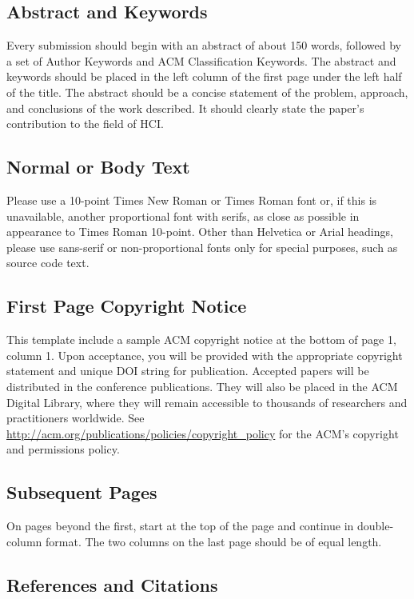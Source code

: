 \documentclass{sigchi}
\begin{document}
\subsection{Abstract and Keywords}

Every submission should begin with an abstract of about 150 words,
followed by a set of Author Keywords and ACM Classification
Keywords. The abstract and keywords should be placed in the left
column of the first page under the left half of the title. The
abstract should be a concise statement of the problem, approach, and
conclusions of the work described. It should clearly state the paper's
contribution to the field of HCI\@.

\subsection{Normal or Body Text}

Please use a 10-point Times New Roman or Times Roman font or, if this
is unavailable, another proportional font with serifs, as close as
possible in appearance to Times Roman 10-point. Other than Helvetica
or Arial headings, please use sans-serif or non-proportional fonts
only for special purposes, such as source code text.

\subsection{First Page Copyright Notice}
This template include a sample ACM copyright notice at the bottom of
page 1, column 1.  Upon acceptance, you will be provided with the
appropriate copyright statement and unique DOI string for publication.
Accepted papers will be distributed in the conference
publications. They will also be placed in the ACM Digital Library,
where they will remain accessible to thousands of researchers and
practitioners worldwide. See
\url{http://acm.org/publications/policies/copyright_policy} for the
ACM's copyright and permissions policy.

\subsection{Subsequent Pages}

On pages beyond the first, start at the top of the page and continue
in double-column format.  The two columns on the last page should be
of equal length.

\subsection{References and Citations}
\end{document}
